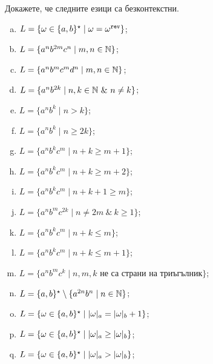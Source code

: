\begin{extra}
\begin{problem}
  Докажете, че следните езици са безконтекстни.
  \begin{enumerate}[a)]
  \item
    $L = \{\omega \in \{a,b\}^\star \mid \omega = \omega^{\texttt{rev}}\}$;
  \item
    $L = \{a^nb^{2m}c^{n} \mid m,n \in \mathbb{N}\}$;
  \item
    $L = \{a^nb^{m}c^{m}d^n \mid m,n \in \mathbb{N}\}$;
  \item
    $L = \{a^nb^{2k} \mid n,k \in \Nat\ \&\ n \neq k\}$;
  \item
    $L = \{a^nb^k \mid n > k\}$;
  \item
    $L = \{a^nb^k \mid n \geq 2k\}$;
  \item
    $L = \{a^nb^kc^m \mid n + k \geq m+1\}$;
  \item
    $L = \{a^nb^kc^m \mid n + k \geq m+2\}$;
  \item
    $L = \{a^nb^kc^m \mid n + k + 1 \geq m\}$;
  \item
    $L = \{a^nb^mc^{2k} \mid n \neq 2m\ \&\ k \geq 1\}$;
  \item
    $L = \{a^nb^kc^m \mid n + k \leq m\}$;
  \item
    $L = \{a^nb^kc^m \mid n + k \leq m+1\}$;
  \item
    $L = \{a^nb^mc^k \mid n, m, k \text{ не са страни на триъгълник}\}$;
  \item
    $L = \{a,b\}^\star \setminus \{a^{2n}b^n \mid n\in\mathbb{N}\}$;
  \item
    $L = \{\omega \in \{a,b\}^\star\mid \vert{\omega}\vert_{a} = \vert{\omega}\vert_{b} + 1\}$;
  \item
    $L = \{\omega \in \{a,b\}^\star\mid \vert{\omega}\vert_{a} \geq \vert{\omega}\vert_{b}\}$;
  \item
    $L = \{\omega \in \{a,b\}^\star\mid \vert{\omega}\vert_{a} > \vert{\omega}\vert_{b}\}$;

\end{enumerate}
\end{problem}
\end{extra}
